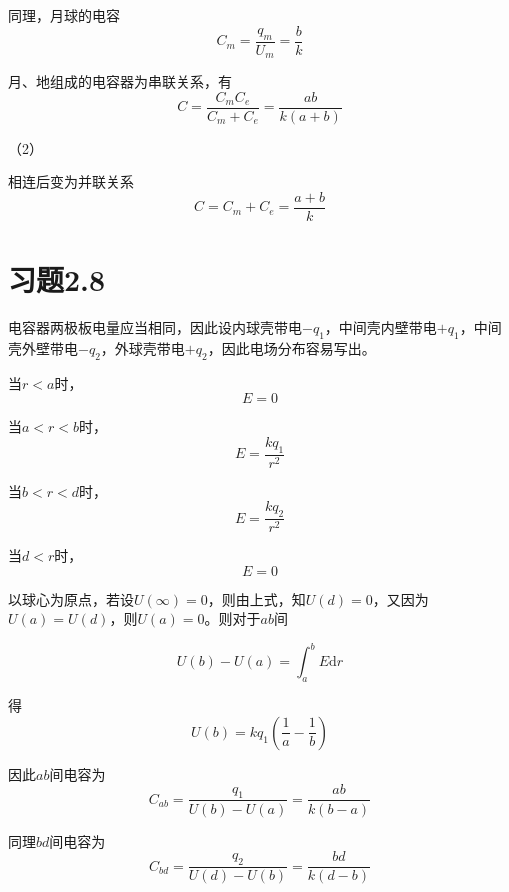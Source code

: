 \documentclass{SCIS2020cn}
\begin{document}
同理，月球的电容
\begin{equation}
    C_m=\frac{q_m}{U_m}=\frac{b}{k}
\end{equation}

月、地组成的电容器为串联关系，有
\begin{equation}
    C=\frac{C_mC_e}{C_m+C_e}=\frac{ab}{k(a+b)}
\end{equation}

（2）

相连后变为并联关系
\begin{equation}
    C=C_m+C_e=\frac{a+b}{k}
\end{equation}
\section{习题2.8}
电容器两极板电量应当相同，因此设内球壳带电$-q_1$，中间壳内壁带电$+q_1$，中间壳外壁带电$-q_2$，外球壳带电$+q_2$，因此电场分布容易写出。

当$r<a$时，
\begin{equation}
    E=0
\end{equation}

当$a<r<b$时，
\begin{equation}
    E=\frac{kq_1}{r^2}
\end{equation}

当$b<r<d$时，
\begin{equation}
    E=\frac{kq_2}{r^2}
\end{equation}

当$d<r$时，
\begin{equation}
    E=0
\end{equation}

以球心为原点，若设$U(\infty)=0$，则由上式，知$U(d)=0$，又因为$U(a)=U(d)$，则$U(a)=0$。则对于$ab$间

\begin{equation}
    U(b)-U(a)=\int_a^bE\text{d}r
\end{equation}

得
\begin{equation}
    U(b)=kq_1\left(\frac{1}{a}-\frac{1}{b}\right)
\end{equation}

因此$ab$间电容为
\begin{equation}
    C_{ab}=\frac{q_1}{U(b)-U(a)}=\frac{ab}{k(b-a)}
\end{equation}

同理$bd$间电容为
\begin{equation}
    C_{bd}=\frac{q_2}{U(d)-U(b)}=\frac{bd}{k(d-b)}
\end{equation}
\end{document}
